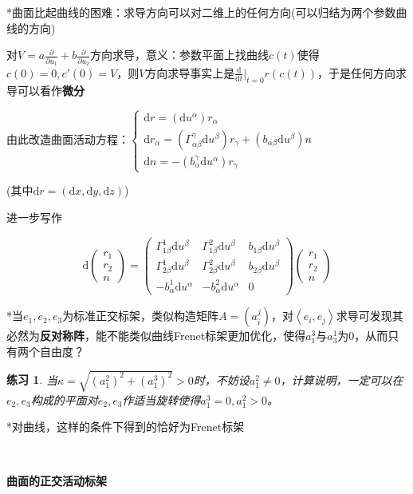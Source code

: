 \documentclass[a4paper,UTF8,fontset=windows]{ctexart}
\newtheorem*{hw}{练习}
\begin{document}
*曲面比起曲线的困难：求导方向可以对二维上的任何方向(可以归结为两个参数曲线的方向)

对$V=a\frac{\partial}{\partial u_1}+b\frac{\partial}{\partial u_2}$方向求导，意义：参数平面上找曲线$c(t)$使得$c(0)=0,c'(0)=V$，则$V$方向求导事实上是$\frac{\mathrm{d}}{\mathrm{d}t}\big|_{t=0}r(c(t))$，于是任何方向求导可以看作\textbf{微分}

由此改造曲面活动方程：$\begin{cases}\mathrm{d}r=(\mathrm{d}u^\alpha)r_\alpha\\\mathrm{d}r_\alpha=(\Gamma_{\alpha\beta}^\gamma\mathrm{d}u^\beta)r_\gamma+(b_{\alpha\beta}\mathrm{d}u^\beta)n\\\mathrm{d}n=-(b_\alpha^\gamma\mathrm{d}u^\alpha)r_\gamma\end{cases}$

(其中$\mathrm{d}r=(\mathrm{d}x,\mathrm{d}y,\mathrm{d}z)$)

进一步写作

$$\mathrm{d}\begin{pmatrix}r_1\\r_2\\n\end{pmatrix}=\begin{pmatrix}\Gamma_{1\beta}^1\mathrm{d}u^\beta&\Gamma_{1\beta}^2\mathrm{d}u^\beta&b_{1\beta}\mathrm{d}u^\beta\\\Gamma_{2\beta}^1\mathrm{d}u^\beta&\Gamma_{2\beta}^2\mathrm{d}u^\beta&b_{2\beta}\mathrm{d}u^\beta\\-b_\alpha^1\mathrm{d}u^\alpha&-b_\alpha^2\mathrm{d}u^\alpha&0\end{pmatrix}\begin{pmatrix}r_1\\r_2\\n\end{pmatrix}$$

*当$e_1,e_2,e_3$为标准正交标架，类似构造矩阵$A=(a_i^j)$，对$\left<e_i,e_j\right>$求导可发现其必然为\textbf{反对称阵}，能不能类似曲线Frenet标架更加优化，使得$a_1^3$与$a_3^1$为0，从而只有两个自由度？

\begin{hw}当$\kappa=\sqrt{(a_1^2)^2+(a_1^3)^2}>0$时，不妨设$a_1^2\ne0$，计算说明，一定可以在$e_2,e_3$构成的平面对$e_2,e_3$作适当旋转使得$a_1^3=0,a_1^2>0$。\end{hw}

*对曲线，这样的条件下得到的恰好为Frenet标架

\

\textbf{曲面的正交活动标架}
\end{document}
